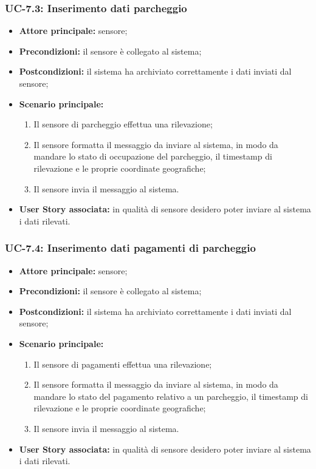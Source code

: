 \documentclass[8pt]{article}
\begin{document}
\subsubsection*{UC-7.3: Inserimento dati parcheggio}
\begin{itemize}
    \item \textbf{Attore principale:} sensore;
    \item \textbf{Precondizioni:} il sensore è collegato al sistema;
    \item \textbf{Postcondizioni:} il sistema ha archiviato correttamente i dati inviati dal sensore;
    \item \textbf{Scenario principale:}
        \begin{enumerate}
        \item Il sensore di parcheggio effettua una rilevazione;
        \item Il sensore formatta il messaggio da inviare al sistema, in modo da mandare lo stato
            di occupazione del parcheggio, il timestamp di rilevazione e le proprie
coordinate geografiche;
        \item Il sensore invia il messaggio al sistema.
        \end{enumerate}
    \item \textbf{User Story associata:} in qualità di sensore desidero poter inviare al sistema i
        dati rilevati.
\end{itemize}
\subsubsection*{UC-7.4: Inserimento dati pagamenti di parcheggio}
\begin{itemize}
    \item \textbf{Attore principale:} sensore;
    \item \textbf{Precondizioni:} il sensore è collegato al sistema;
    \item \textbf{Postcondizioni:} il sistema ha archiviato correttamente i dati inviati dal sensore;
    \item \textbf{Scenario principale:}
        \begin{enumerate}
        \item Il sensore di pagamenti effettua una rilevazione;
        \item Il sensore formatta il messaggio da inviare al sistema, in modo da mandare lo stato
            del pagamento relativo a un parcheggio, il timestamp di rilevazione e le proprie
coordinate geografiche;
        \item Il sensore invia il messaggio al sistema.
        \end{enumerate}
    \item \textbf{User Story associata:} in qualità di sensore desidero poter inviare al sistema i
        dati rilevati.
\end{itemize}
\end{document}
